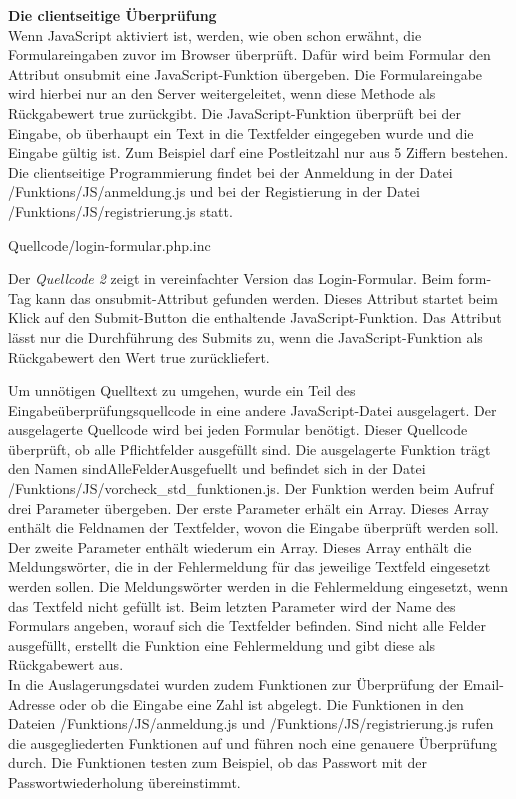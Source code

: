\textbf{Die clientseitige Überprüfung}\\
Wenn JavaScript aktiviert ist, werden, wie oben schon erwähnt, die Formulareingaben zuvor im Browser überprüft. Dafür wird beim Formular den Attribut \glqq onsubmit\grqq{} eine JavaScript-Funktion übergeben. Die Formulareingabe wird hierbei nur an den Server weitergeleitet, wenn diese Methode als Rückgabewert \glqq true\grqq{} zurückgibt. Die JavaScript-Funktion überprüft bei der Eingabe, ob überhaupt ein Text in die Textfelder eingegeben wurde und die Eingabe gültig ist. Zum Beispiel darf eine Postleitzahl nur aus 5 Ziffern bestehen. Die clientseitige Programmierung findet bei der Anmeldung in der Datei \glqq /Funktions/JS/anmeldung.js\grqq{} und bei der Registierung in der Datei \glqq /Funktions/JS/registrierung.js\grqq{} statt.

\newpage
\begin{center}
	\begin{lstinputlisting}[language=HTML, caption={Login-Formular (vereinfacht)}]
		{Quellcode/login-formular.php.inc}
	\end{lstinputlisting}
\end{center}

Der \textit{Quellcode 2} zeigt in vereinfachter Version das Login-Formular. Beim \glqq form\grqq{}-Tag kann das \glqq onsubmit\grqq{}-Attribut gefunden werden. Dieses Attribut startet beim Klick auf den Submit-Button die enthaltende JavaScript-Funktion. Das Attribut lässt nur die Durchführung des Submits zu, wenn die JavaScript-Funktion als Rückgabewert den Wert \glqq true\grqq{} zurückliefert.

Um unnötigen Quelltext zu umgehen, wurde ein Teil des Eingabeüberprüfungsquellcode in eine andere JavaScript-Datei ausgelagert. Der ausgelagerte Quellcode wird bei jeden Formular benötigt. Dieser Quellcode überprüft, ob alle Pflichtfelder ausgefüllt sind. Die ausgelagerte Funktion trägt den Namen \glqq sindAlleFelderAusgefuellt\grqq{} und befindet sich in der Datei \glqq /Funktions/JS/vorcheck\_std\_funktionen.js\grqq{}. Der Funktion werden beim Aufruf drei Parameter übergeben. Der erste Parameter erhält ein Array. Dieses Array enthält die Feldnamen der Textfelder, wovon die Eingabe überprüft werden soll. Der zweite Parameter enthält wiederum ein Array. Dieses Array enthält die Meldungswörter, die in der Fehlermeldung für das jeweilige Textfeld eingesetzt werden sollen. Die Meldungswörter werden in die Fehlermeldung eingesetzt, wenn das Textfeld nicht gefüllt ist. Beim letzten Parameter wird der Name des Formulars angeben, worauf sich die Textfelder befinden. Sind nicht alle Felder ausgefüllt, erstellt die Funktion eine Fehlermeldung und gibt diese als Rückgabewert aus.\\
In die Auslagerungsdatei wurden zudem Funktionen zur Überprüfung der Email-Adresse oder ob die Eingabe eine Zahl ist abgelegt. Die Funktionen in den Dateien \glqq /Funktions/JS/anmeldung.js\grqq{} und  
\glqq /Funktions/JS/registrierung.js\grqq{} rufen die ausgegliederten Funktionen auf und führen noch eine genauere Überprüfung durch. Die Funktionen testen zum Beispiel, ob das Passwort mit der Passwortwiederholung übereinstimmt.\\

